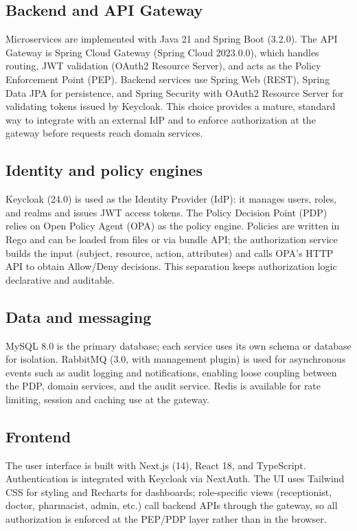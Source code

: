 \subsection{Backend and API Gateway}
Microservices are implemented with Java 21 and Spring Boot (3.2.0). The API Gateway is Spring Cloud Gateway (Spring Cloud 2023.0.0), which handles routing, JWT validation (OAuth2 Resource Server), and acts as the Policy Enforcement Point (PEP). Backend services use Spring Web (REST), Spring Data JPA for persistence, and Spring Security with OAuth2 Resource Server for validating tokens issued by Keycloak. This choice provides a mature, standard way to integrate with an external IdP and to enforce authorization at the gateway before requests reach domain services.

\subsection{Identity and policy engines}
Keycloak (24.0) is used as the Identity Provider (IdP): it manages users, roles, and realms and issues JWT access tokens. The Policy Decision Point (PDP) relies on Open Policy Agent (OPA) as the policy engine. Policies are written in Rego and can be loaded from files or via bundle API; the authorization service builds the input (subject, resource, action, attributes) and calls OPA's HTTP API to obtain Allow/Deny decisions. This separation keeps authorization logic declarative and auditable.

\subsection{Data and messaging}
MySQL 8.0 is the primary database; each service uses its own schema or database for isolation. RabbitMQ (3.0, with management plugin) is used for asynchronous events such as audit logging and notifications, enabling loose coupling between the PDP, domain services, and the audit service. Redis is available for rate limiting, session and caching use at the gateway.

\subsection{Frontend}
The user interface is built with Next.js (14), React 18, and TypeScript. Authentication is integrated with Keycloak via NextAuth. The UI uses Tailwind CSS for styling and Recharts for dashboards; role-specific views (receptionist, doctor, pharmacist, admin, etc.) call backend APIs through the gateway, so all authorization is enforced at the PEP/PDP layer rather than in the browser.

